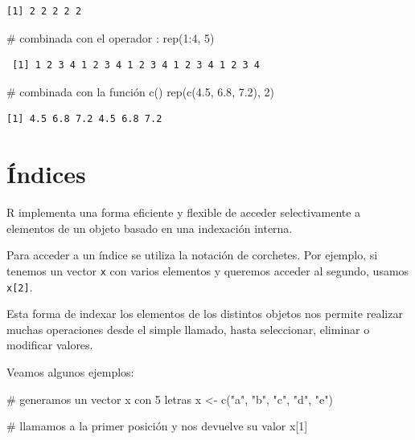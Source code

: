 \documentclass[
  spanish,
  a4paper,
]{scrbook}
\newenvironment{Shaded}{\begin{snugshade}}{\end{snugshade}}
\newcommand{\CommentTok}[1]{\textcolor[rgb]{0.37,0.37,0.37}{#1}}
\newcommand{\DecValTok}[1]{\textcolor[rgb]{0.68,0.00,0.00}{#1}}
\newcommand{\FloatTok}[1]{\textcolor[rgb]{0.68,0.00,0.00}{#1}}
\newcommand{\FunctionTok}[1]{\textcolor[rgb]{0.28,0.35,0.67}{#1}}
\newcommand{\NormalTok}[1]{\textcolor[rgb]{0.00,0.23,0.31}{#1}}
\newcommand{\OtherTok}[1]{\textcolor[rgb]{0.00,0.23,0.31}{#1}}
\newcommand{\SpecialCharTok}[1]{\textcolor[rgb]{0.37,0.37,0.37}{#1}}
\newcommand{\StringTok}[1]{\textcolor[rgb]{0.13,0.47,0.30}{#1}}
\begin{document}
\begin{verbatim}
[1] 2 2 2 2 2
\end{verbatim}

\begin{Shaded}
\begin{Highlighting}[]
\CommentTok{\# combinada con el operador :}
\FunctionTok{rep}\NormalTok{(}\DecValTok{1}\SpecialCharTok{:}\DecValTok{4}\NormalTok{, }\DecValTok{5}\NormalTok{)}
\end{Highlighting}
\end{Shaded}

\begin{verbatim}
 [1] 1 2 3 4 1 2 3 4 1 2 3 4 1 2 3 4 1 2 3 4
\end{verbatim}

\begin{Shaded}
\begin{Highlighting}[]
\CommentTok{\# combinada con la función c()}
\FunctionTok{rep}\NormalTok{(}\FunctionTok{c}\NormalTok{(}\FloatTok{4.5}\NormalTok{, }\FloatTok{6.8}\NormalTok{, }\FloatTok{7.2}\NormalTok{), }\DecValTok{2}\NormalTok{)}
\end{Highlighting}
\end{Shaded}

\begin{verbatim}
[1] 4.5 6.8 7.2 4.5 6.8 7.2
\end{verbatim}

\section{Índices}\label{uxedndices}

R implementa una forma eficiente y flexible de acceder selectivamente a
elementos de un objeto basado en una indexación interna.

Para acceder a un índice se utiliza la notación de corchetes. Por
ejemplo, si tenemos un vector \texttt{x} con varios elementos y queremos
acceder al segundo, usamos \texttt{x{[}2{]}}.

Esta forma de indexar los elementos de los distintos objetos nos permite
realizar muchas operaciones desde el simple llamado, hasta seleccionar,
eliminar o modificar valores.

Veamos algunos ejemplos:

\begin{Shaded}
\begin{Highlighting}[]
\CommentTok{\# generamos un vector x con 5 letras}
\NormalTok{x }\OtherTok{\textless{}{-}} \FunctionTok{c}\NormalTok{(}\StringTok{"a"}\NormalTok{, }\StringTok{"b"}\NormalTok{, }\StringTok{"c"}\NormalTok{, }\StringTok{"d"}\NormalTok{, }\StringTok{"e"}\NormalTok{)}

\CommentTok{\# llamamos a la primer posición y nos devuelve su valor}
\NormalTok{x[}\DecValTok{1}\NormalTok{]}
\end{Highlighting}
\end{Shaded}
\end{document}
